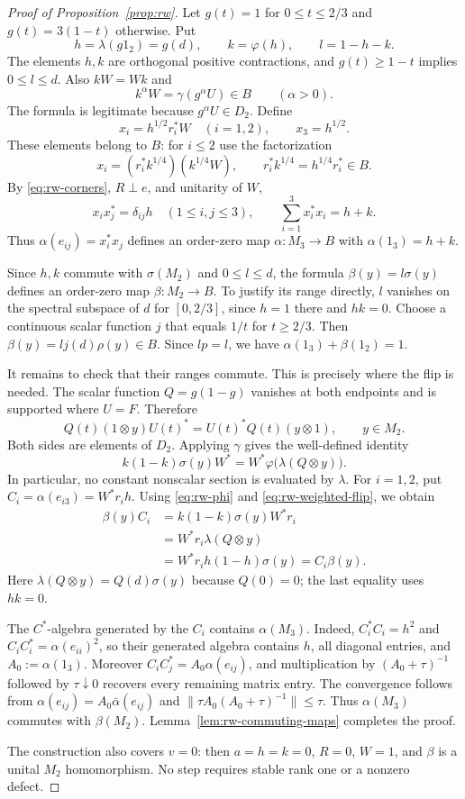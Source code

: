 \begin{proof}[Proof of Proposition~\ref{prop:rw}]
Let $g(t)=1$ for $0\le t\le2/3$ and $g(t)=3(1-t)$ otherwise.
Put
\[
 h=\lambda(g1_2)=g(d),\qquad k=\varphi(h),\qquad l=1-h-k.
\]
The elements $h,k$ are orthogonal positive contractions, and
$g(t)\ge1-t$ implies $0\le l\le d$. Also $kW=Wk$ and
\[
 k^\alpha W=\gamma(g^\alpha U)\in B\qquad(\alpha>0).
\]
The formula is legitimate because $g^\alpha U\in D_2$.
Define
\[
 x_i=h^{1/2}r_i^*W\quad(i=1,2),\qquad x_3=h^{1/2}.
\]
These elements belong to $B$: for $i\le2$ use the factorization
\[
 x_i=(r_i^*k^{1/4})(k^{1/4}W),\qquad
 r_i^*k^{1/4}=h^{1/4}r_i^*\in B.
\]
By \eqref{eq:rw-corners}, $R\perp e$, and unitarity of $W$,
\[
 x_i x_j^*=\delta_{ij}h\quad(1\le i,j\le3),\qquad
 \sum_{i=1}^3x_i^*x_i=h+k.
\]
Thus $\alpha(e_{ij})=x_i^*x_j$ defines an order-zero map
$\alpha:M_3\to B$ with $\alpha(1_3)=h+k$.

Since $h,k$ commute with $\sigma(M_2)$ and $0\le l\le d$, the
formula $\beta(y)=l\sigma(y)$ defines an order-zero map
$\beta:M_2\to B$. To justify its range directly, $l$ vanishes on
the spectral subspace of $d$ for $[0,2/3]$, since $h=1$ there and
$hk=0$. Choose a continuous scalar function $j$ that equals $1/t$
for $t\ge2/3$. Then
$\beta(y)=lj(d)\rho(y)\in B$.
Since $lp=l$, we have
$\alpha(1_3)+\beta(1_2)=1$.

It remains to check that their ranges commute. This is precisely
where the flip is needed. The scalar function $Q=g(1-g)$ vanishes
at both endpoints and is supported where $U=F$. Therefore
\[
 Q(t)(1\otimes y)U(t)^*
   =U(t)^*Q(t)(y\otimes1),\qquad y\in M_2.
\]
Both sides are elements of $D_2$. Applying $\gamma$ gives the
well-defined identity
\begin{equation}\label{eq:rw-weighted-flip}
 k(1-k)\sigma(y)W^*
       =W^*\varphi\bigl(\lambda(Q\otimes y)\bigr).
\end{equation}
In particular, no constant nonscalar section is evaluated by
$\lambda$. For $i=1,2$, put
$C_i=\alpha(e_{i3})=W^*r_i h$. Using
\eqref{eq:rw-phi} and \eqref{eq:rw-weighted-flip}, we obtain
\[
\begin{aligned}
 \beta(y)C_i
 &=k(1-k)\sigma(y)W^*r_i\\
 &=W^*r_i\lambda(Q\otimes y)\\
 &=W^*r_i h(1-h)\sigma(y)
  =C_i\beta(y).
\end{aligned}
\]
Here $\lambda(Q\otimes y)=Q(d)\sigma(y)$ because $Q(0)=0$;
the last equality uses $hk=0$.

The $C^*$-algebra generated by the $C_i$ contains $\alpha(M_3)$. Indeed,
$C_i^*C_i=h^2$ and $C_iC_i^*=\alpha(e_{ii})^2$, so their generated
algebra contains $h$, all diagonal entries, and
$A_0:=\alpha(1_3)$. Moreover
$C_iC_j^*=A_0\alpha(e_{ij})$, and multiplication by
$(A_0+\tau)^{-1}$ followed by $\tau\downarrow0$ recovers every
remaining matrix entry. The convergence follows from
$\alpha(e_{ij})=A_0\bar\alpha(e_{ij})$ and
$\|\tau A_0(A_0+\tau)^{-1}\|\le\tau$.
Thus $\alpha(M_3)$ commutes with $\beta(M_2)$.
Lemma~\ref{lem:rw-commuting-maps} completes the proof.

The construction also covers $v=0$: then $a=h=k=0$, $R=0$,
$W=1$, and $\beta$ is a unital $M_2$ homomorphism. No step requires
stable rank one or a nonzero defect.
\end{proof}
